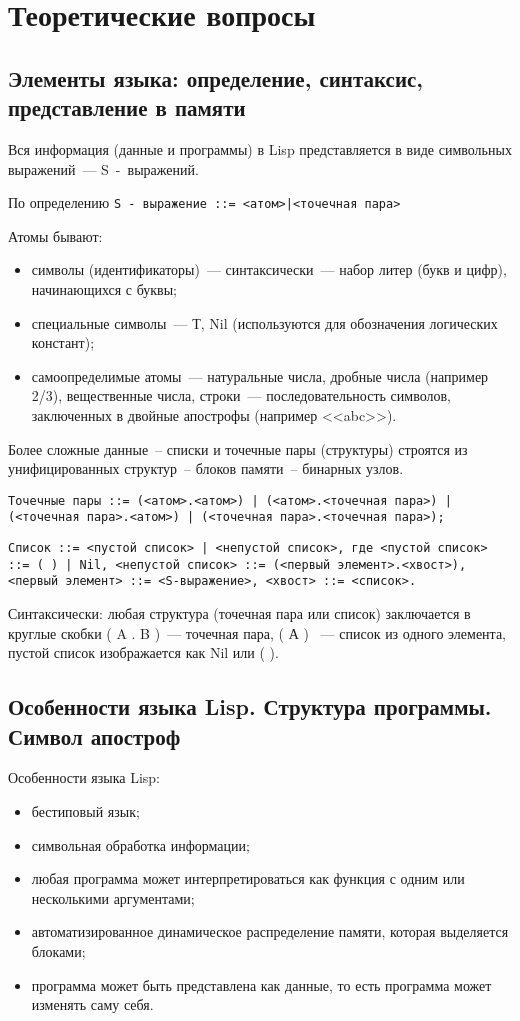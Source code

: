\chapter{Теоретические вопросы}

\section{Элементы языка: определение, синтаксис, представление в памяти}

Вся информация (данные и программы) в Lisp представляется в виде символьных выражений~--- S~-~выражений.

По определению \texttt{S~-~выражение ::= <атом>|<точечная пара>}

Атомы бывают:
\begin{itemize}
	\item символы (идентификаторы)~--- синтаксически~--- набор литер (букв и цифр), начинающихся с буквы;
	\item специальные символы~--- {Т, Nil} (используются для обозначения логических констант);
	\item самоопределимые атомы~--- натуральные числа, дробные числа (например 2/3), вещественные числа, строки~--- последовательность символов, заключенных в двойные апострофы (например <<abc>>).
\end{itemize}

Более сложные данные~-- списки и точечные пары (структуры) строятся из унифицированных структур~-- блоков памяти~-- бинарных узлов.

\texttt{Точечные пары ::= (<атом>.<атом>) | (<атом>.<точечная пара>) |(<точечная пара>.<атом>) | (<точечная пара>.<точечная пара>);}

\texttt{Список ::= <пустой список> | <непустой список>, где
<пустой список> ::= ( ) | Nil,
<непустой список> ::= (<первый элемент>.<хвост>),
<первый элемент> ::= <S-выражение>, <хвост> ::= <список>.}

Синтаксически: любая структура (точечная пара или список) заключается в круглые скобки ( A . B )~--- точечная пара, ( А ) ~--- список из одного элемента, пустой список изображается как Nil или ( ).

\clearpage

\section{Особенности языка Lisp. Структура программы. Символ апостроф}

Особенности языка Lisp:
\begin{itemize}
	\item бестиповый язык;
	\item символьная обработка информации;
	\item любая программа может интерпретироваться как функция с одним или несколькими аргументами;
	\item автоматизированное динамическое распределение памяти, которая выделяется блоками;
	\item программа может быть представлена как данные, то есть программа может изменять саму себя.
\end{itemize}

